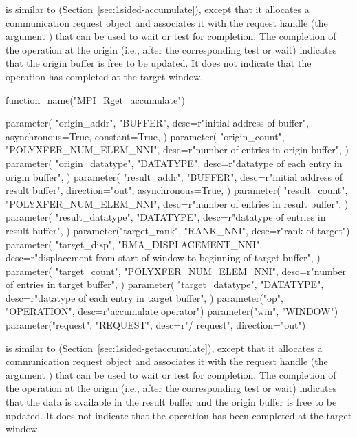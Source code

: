  is similar to 
(Section~\ref{sec:1sided-accumulate}),
except that it allocates a communication request object and associates
it with the request handle (the argument ) that can be
used to wait or test for completion. The completion of the
operation at the origin (i.e., after the corresponding test or wait) indicates that the origin buffer
is free to be updated. It does not indicate that the operation has
completed at the target window.

%
%
%
\begin{mpi-binding}
    function_name("MPI_Rget_accumulate")
    
    parameter(
        "origin_addr",
        "BUFFER",
        desc=r"initial address of buffer",
        asynchronous=True,
        constant=True,
    )
    parameter(
        "origin_count",
        "POLYXFER_NUM_ELEM_NNI",
        desc=r"number of entries in origin buffer",
    )
    parameter(
        "origin_datatype",
        "DATATYPE",
        desc=r"datatype of each entry in origin buffer",
    )
    parameter(
        "result_addr",
        "BUFFER",
        desc=r"initial address of result buffer",
        direction="out",
        asynchronous=True,
    )
    parameter(
        "result_count",
        "POLYXFER_NUM_ELEM_NNI",
        desc=r"number of entries in result buffer",
    )
    parameter(
        "result_datatype",
        "DATATYPE",
        desc=r"datatype of entries in result buffer",
    )
    parameter("target_rank", "RANK_NNI", desc=r"rank of target")
    parameter(
        "target_disp",
        "RMA_DISPLACEMENT_NNI",
        desc=r"displacement from start of window to beginning of target buffer",
    )
    parameter(
        "target_count",
        "POLYXFER_NUM_ELEM_NNI",
        desc=r"number of entries in target buffer",
    )
    parameter(
        "target_datatype",
        "DATATYPE",
        desc=r"datatype of each entry in target buffer",
    )
    parameter("op", "OPERATION", desc=r"accumulate operator")
    parameter("win", "WINDOW")
    parameter("request", "REQUEST", desc=r"\RMA/ request", direction="out")
\end{mpi-binding}

 is similar to
 (Section~\ref{sec:1sided-getaccumulate}), except that it allocates a
communication request object and associates it with the request handle
(the argument ) that can be used to wait or test for
completion. The completion of the
operation at the origin (i.e., after the corresponding test or wait)
indicates that the data is available in the result buffer
and the origin buffer is free to be updated. It does not indicate that
the operation has been completed at the target window.

